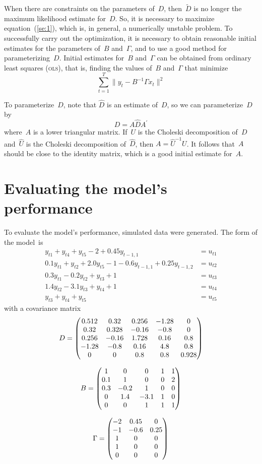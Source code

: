 When there are constraints on the parameters of~$D$, then~$\tilde D$ is
no longer the maximum likelihood estimate for~$D$.  So,
 it is necessary to 
maximize equation~(\ref{se:1}), which is, in general, a numerically unstable problem. 
To successfully carry out the optimization, it is necessary to obtain
reasonable initial estimates for the parameters of~$B$ and~$\Gamma$,
and to use a good method for parameterizing~$D$.
Initial estimates for~$B$ and~$\Gamma$ can be obtained from ordinary
least squares (\textsc{ols}), that is, finding the values 
of~$B$ and~$\Gamma$ that minimize
$$\sum_{t=1}^T \|y_t - B^{-1}\Gamma x_t\|^2$$

To parameterize~$D$, note that $\hat D$ is an estimate of~$D$,
so we can parameterize~$D$ by
$$ D = A \hat D A^\prime$$
where~$A$ is a lower triangular matrix. If~$U$ is the Choleski
decomposition of~$D$ and~$\hat U$ is the Choleski decomposition
of~$\hat D$, then $A=\hat U^{-1}U$.
It follows that~$A$ should be close to the identity matrix, which
is a good initial estimate for~$A$. 


\section{Evaluating the model's performance} 

To evaluate the model's performance, simulated data were generated.
The form of the model~is
 \begin{align}
   \nonumber y_{t1}+y_{t4}+y_{t5}-2+0.45y_{t-1,1}&=u_{t1}\\
   \nonumber 0.1y_{t1}+y_{t2}+2.0y_{t5}-1-0.6y_{t-1,1}+0.25y_{t-1,2}&=u_{t2}\\
   \nonumber 0.3y_{t1}-0.2y_{t2}+y_{t3}+1&=u_{t3}\\
   \nonumber 1.4y_{t2}-3.1y_{t3}+y_{t4}+1&=u_{t4}\\
   y_{t3}+y_{t4}+y_{t5}&=u_{t5}
 \end{align}
with a covariance matrix
$$D=\begin{pmatrix}
0.512&0.32&0.256&-1.28&0\cr
0.32&0.328&-0.16&-0.8&0\cr
0.256&-0.16&1.728&0.16&0.8\cr
-1.28&-0.8&0.16&4.8&0.8\cr
0&0&0.8&0.8&0.928
\end{pmatrix}
$$

\bigskip
$$B=\begin{pmatrix} 
    1&0&0&1&1\cr
    0.1&1&0&0&2\cr
      0.3&-0.2&1&0&0\cr
      0&1.4&-3.1&1&0\cr
      0&0&1&1&1
  \end{pmatrix}
$$

\bigskip
$$\Gamma=\begin{pmatrix}-2&0.45&0\cr
         -1&-0.6&0.25\cr
          1&0&0\cr
          1&0&0\cr
          0&0&0
   \end{pmatrix}
$$

